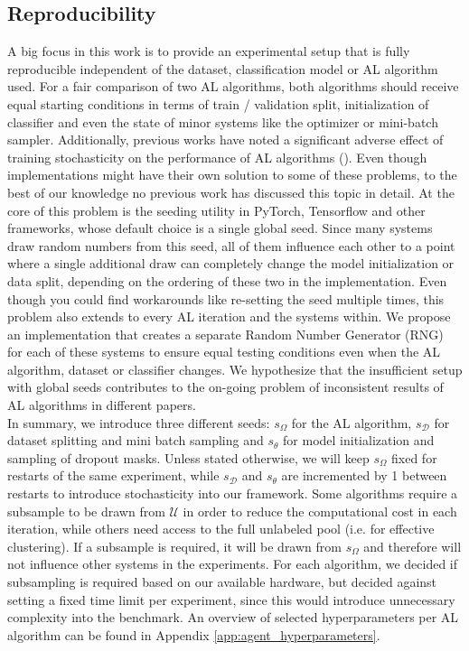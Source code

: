 \documentclass[]{article}
\begin{document}
\subsection{Reproducibility}\label{sec:reproducibility}
A big focus in this work is to provide an experimental setup that is fully reproducible independent of the dataset, classification model or AL algorithm used.
For a fair comparison of two AL algorithms, both algorithms should receive equal starting conditions in terms of train / validation split, initialization of classifier and even the state of minor systems like the optimizer or mini-batch sampler.
Additionally, previous works have noted a significant adverse effect of training stochasticity on the performance of AL algorithms (\cite{zhou2021towards, lowell2018practical}).
Even though implementations might have their own solution to some of these problems, to the best of our knowledge no previous work has discussed this topic in detail.
At the core of this problem is the seeding utility in PyTorch, Tensorflow and other frameworks, whose default choice is a single global seed.
Since many systems draw random numbers from this seed, all of them influence each other to a point where a single additional draw can completely change the model initialization or data split, depending on the ordering of these two in the implementation.
Even though you could find workarounds like re-setting the seed multiple times, this problem also extends to every AL iteration and the systems within.
We propose an implementation that creates a separate Random Number Generator (RNG) for each of these systems to ensure equal testing conditions even when the AL algorithm, dataset or classifier changes.
We hypothesize that the insufficient setup with global seeds contributes to the on-going problem of inconsistent results of AL algorithms in different papers. \\ [1mm]
In summary, we introduce three different seeds: $s_\Omega$ for the AL algorithm, $s_\mathcal{D}$ for dataset splitting and mini batch sampling and $s_\theta$ for model initialization and sampling of dropout masks.
Unless stated otherwise, we will keep $s_\Omega$ fixed for restarts of the same experiment, while $s_\mathcal{D}$ and $s_\theta$ are incremented by 1 between restarts to introduce stochasticity into our framework.
Some algorithms require a subsample to be drawn from $\mathcal{U}$ in order to reduce the computational cost in each iteration, while others need access to the full unlabeled pool (i.e. for effective clustering).
If a subsample is required, it will be drawn from $s_\Omega$ and therefore will not influence other systems in the experiments.
For each algorithm, we decided if subsampling is required based on our available hardware, but decided against setting a fixed time limit per experiment, since this would introduce unnecessary complexity into the benchmark.
An overview of selected hyperparameters per AL algorithm can be found in Appendix \ref{app:agent_hyperparameters}.
\end{document}
